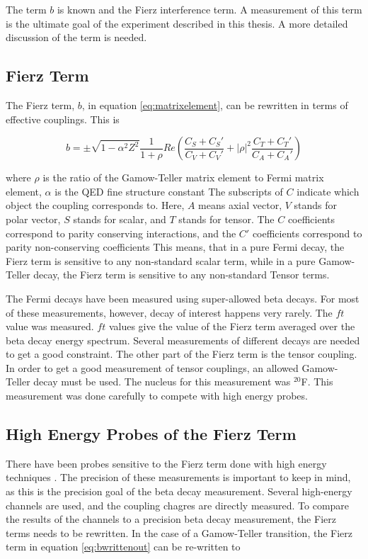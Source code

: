 \documentclass[../MaxHughesThesis.tex]{subfiles}
\begin{document}
The term $b$ is known and the Fierz interference term.
A measurement of this term is the ultimate goal of the experiment described in this thesis.
A more detailed discussion of the term is needed.

\subsection{Fierz Term}
The Fierz term, $b$, in equation \ref{eq:matrixelement}, can be rewritten in terms of effective couplings.
This is %

\begin{equation}
	b =  \pm \sqrt{1 - \alpha^{2}{Z^{2}}}\frac{1}{1 + \rho}Re(\frac{C_{S} + C_{S}'}{C_{V} + C_{V}'} + |\rho|^{2}\frac{C_{T} + C_{T}'}{C_{A} + C_{A}'})
	\label{eq:bwrittenout}
\end{equation}

where $\rho$ is the ratio of the Gamow-Teller matrix element to Fermi matrix element, $\alpha$ is the QED fine structure constant \cite{Gon19}
The subscripts of $C$ indicate which object the coupling corresponds to. 
Here, $A$ means axial vector, $V$ stands for polar vector, $S$ stands for scalar, and $T$ stands for tensor. 
The $C$ coefficients correspond to parity conserving interactions, and the $C'$ coefficients correspond to parity non-conserving coefficients \cite{Lee56}
This means, that in a pure Fermi decay, the Fierz term is sensitive to any non-standard scalar term, while in a pure Gamow-Teller decay, the Fierz term is sensitive to any non-standard Tensor terms. 

The Fermi decays have been measured using super-allowed beta decays.
For most of these measurements, however, decay of interest happens very rarely.
The $ft$ value was measured.
$ft$ values give the value of the Fierz term averaged over the beta decay energy spectrum.
Several measurements of different decays are needed to get a good constraint.
The other part of the Fierz term is the tensor coupling. 
In order to get a good measurement of  tensor couplings, an allowed Gamow-Teller decay must be used. 
The nucleus for this measurement was $^{20}$F.
This measurement was done carefully to compete with high energy probes.

\subsection{High Energy Probes of the Fierz Term}

There have been probes sensitive to the Fierz term done with high energy techniques \cite{Gon19}.
The precision of these measurements is important to keep in mind, as this is the precision goal of the beta decay measurement.
Several high-energy channels are used, and the coupling chagres are directly measured.
To compare the results of the channels to a precision beta decay measurement, the Fierz terms needs to be rewritten.
In the case of a Gamow-Teller transition, the Fierz term in equation \ref{eq:bwrittenout} can be re-written to %
\end{document}
